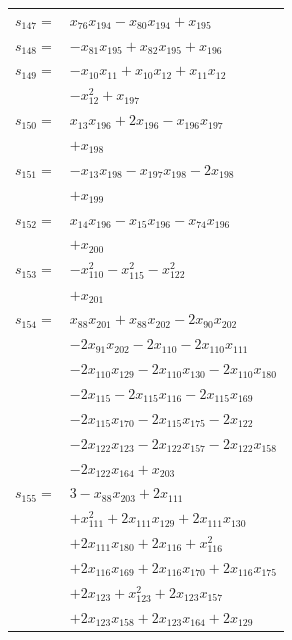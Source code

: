 \begin{longtable}{@{}r@{\;}l@{}}
\(s_{147}=\) & \(\displaystyle x_{76}x_{194} -x_{80}x_{194} +x_{195}\) \\[3pt]
\(s_{148}=\) & \(\displaystyle -x_{81}x_{195} +x_{82}x_{195} +x_{196}\) \\[3pt]
\(s_{149}=\) & \(\displaystyle -x_{10}x_{11} +x_{10}x_{12} +x_{11}x_{12}\) \\
 & \(\displaystyle -x_{12}^{2} +x_{197}\) \\[3pt]
\(s_{150}=\) & \(\displaystyle x_{13}x_{196} +2x_{196} -x_{196}x_{197}\) \\
 & \(\displaystyle +x_{198}\) \\[3pt]
\(s_{151}=\) & \(\displaystyle -x_{13}x_{198} -x_{197}x_{198} -2x_{198}\) \\
 & \(\displaystyle +x_{199}\) \\[3pt]
\(s_{152}=\) & \(\displaystyle x_{14}x_{196} -x_{15}x_{196} -x_{74}x_{196}\) \\
 & \(\displaystyle +x_{200}\) \\[3pt]
\(s_{153}=\) & \(\displaystyle -x_{110}^{2} -x_{115}^{2} -x_{122}^{2}\) \\
 & \(\displaystyle +x_{201}\) \\[3pt]
\(s_{154}=\) & \(\displaystyle x_{88}x_{201} +x_{88}x_{202} -2x_{90}x_{202}\) \\
 & \(\displaystyle -2x_{91}x_{202} -2x_{110} -2x_{110}x_{111}\) \\
 & \(\displaystyle -2x_{110}x_{129} -2x_{110}x_{130} -2x_{110}x_{180}\) \\
 & \(\displaystyle -2x_{115} -2x_{115}x_{116} -2x_{115}x_{169}\) \\
 & \(\displaystyle -2x_{115}x_{170} -2x_{115}x_{175} -2x_{122}\) \\
 & \(\displaystyle -2x_{122}x_{123} -2x_{122}x_{157} -2x_{122}x_{158}\) \\
 & \(\displaystyle -2x_{122}x_{164} +x_{203}\) \\[3pt]
\(s_{155}=\) & \(\displaystyle 3 -x_{88}x_{203} +2x_{111}\) \\
 & \(\displaystyle +x_{111}^{2} +2x_{111}x_{129} +2x_{111}x_{130}\) \\
 & \(\displaystyle +2x_{111}x_{180} +2x_{116} +x_{116}^{2}\) \\
 & \(\displaystyle +2x_{116}x_{169} +2x_{116}x_{170} +2x_{116}x_{175}\) \\
 & \(\displaystyle +2x_{123} +x_{123}^{2} +2x_{123}x_{157}\) \\
 & \(\displaystyle +2x_{123}x_{158} +2x_{123}x_{164} +2x_{129}\) \\

\end{longtable}
